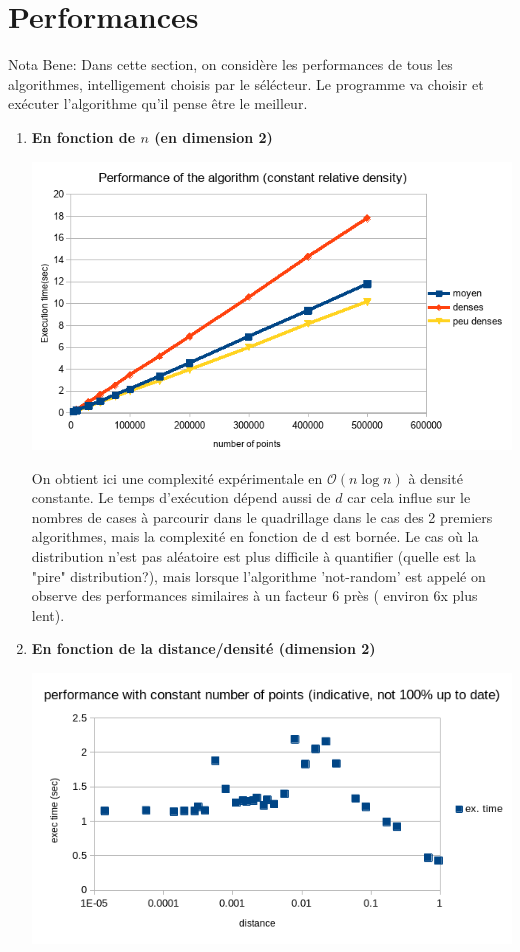 \documentclass[a4paper,11pt]{article}
\begin{document}
\section{Performances}
\smallbreak 
Nota Bene: Dans cette section, on considère les performances de tous les algorithmes, intelligement choisis par le sélécteur. Le programme va choisir et exécuter l'algorithme qu'il pense être le meilleur.\\
    \begin{enumerate}
    \item \textbf{En fonction de $n$ (en dimension 2)}\\
\begin{center}
\includegraphics[scale=2.5]{perfs_densite_cste.png}
\end{center}
		    On obtient ici une complexité expérimentale en $\mathcal{O}(n \log n)$ à densité constante. Le temps d'exécution dépend aussi de $d$ car cela influe sur le nombres de cases à parcourir dans le quadrillage dans le cas des 2 premiers algorithmes, mais la complexité en fonction de d est bornée. Le cas où la distribution n'est pas aléatoire est plus difficile à quantifier (quelle est la "pire" distribution?), mais lorsque l'algorithme 'not-random' est appelé on observe des performances similaires à un facteur 6 près ( environ 6x plus lent).
\clearpage
 \item \textbf{En fonction de la distance/densité (dimension 2)}\\
\begin{center}

\includegraphics[scale =0.7]{perfs_with_ditance.png}
\end{center}


\end{enumerate}
\end{document}
